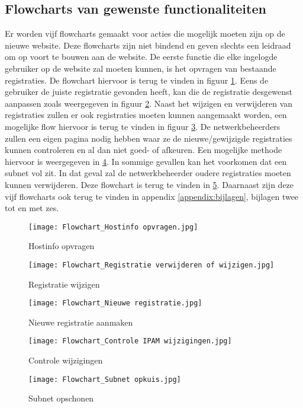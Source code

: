 \subsection{Flowcharts van gewenste functionaliteiten}
Er worden vijf flowcharts gemaakt voor acties die mogelijk moeten zijn op de nieu\-we website. Deze flowcharts zijn niet bindend en geven slechts een leidraad om op voort te bouwen aan de website.
De eerste functie die elke ingelogde gebruiker op de website zal moeten kunnen, is het opvragen van bestaande registraties. De flowchart hiervoor is terug te vinden in figuur  \ref{fig:flowchart_hostinfo_opvragen}. Eens de gebruiker de juiste registratie gevonden heeft, kan die de registratie desgewenst aanpassen zoals weergegeven in figuur \ref{fig:flowchart_registratie_wijzigen}. Naast het wijzigen en verwijderen van registraties zullen er ook registraties moeten kunnen aangemaakt worden, een mogelijke flow hiervoor is terug te vinden in figuur \ref{fig:flowchart_nieuwe_registratie}.
De netwerkbeheerders zullen een eigen pagina nodig hebben waar ze de nieuwe/gewijzigde registraties kunnen controleren en al dan niet goed- of afkeuren. Een mogelijke methode hiervoor is weergegeven in \ref{fig:flowchart_controle_Wijzigingen}. In sommige gevallen kan het voorkomen dat een subnet vol zit. In dat geval zal de netwerkbeheerder oudere registraties moeten kunnen verwijderen. Deze flowchart is terug te vinden in \ref{fig:flowchart_subnet_opkuisen}. Daarnaast zijn deze vijf flowcharts ook terug te vinden in appendix \ref{appendix:bijlagen}, bijlagen twee tot en met zes.

\begin{figure}[H]
	\texttt{[image: Flowchart\_Hostinfo opvragen.jpg]}
	\caption{Hostinfo opvragen}
	\label{fig:flowchart_hostinfo_opvragen}
\end{figure}
\begin{figure}[H]
    \texttt{[image: Flowchart\_Registratie verwijderen of wijzigen.jpg]}
    \caption{Registratie wijzigen}
    \label{fig:flowchart_registratie_wijzigen}
\end{figure}
\begin{figure}[H]
    \texttt{[image: Flowchart\_Nieuwe registratie.jpg]}
    \caption{Nieuwe registratie aanmaken}
    \label{fig:flowchart_nieuwe_registratie}
\end{figure}
\begin{figure}[H]
    \texttt{[image: Flowchart\_Controle IPAM wijzigingen.jpg]}
    \caption{Controle wijzigingen}
    \label{fig:flowchart_controle_Wijzigingen}
\end{figure}
\begin{figure}[H]
    \texttt{[image: Flowchart\_Subnet opkuis.jpg]}
    \caption{Subnet opschonen}
    \label{fig:flowchart_subnet_opkuisen}
\end{figure}

